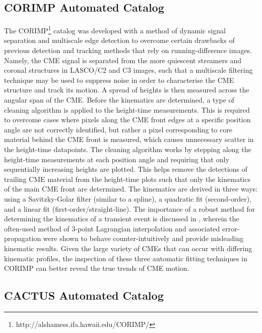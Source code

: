 \documentclass[referee,a4paper,12pt,traditabstract]{swsc}
\begin{document}
\begin{linenumbers}
\subsection{CORIMP Automated Catalog}
\label{sect_corimp}

The CORIMP\footnote{http://alshamess.ifa.hawaii.edu/CORIMP/} catalog was developed with a method of dynamic signal separation and multiscale edge detection to overcome certain drawbacks of previous detection and tracking methods that rely on running-difference images. Namely, the CME signal is separated from the more quiescent streamers and coronal structures in LASCO/C2 and C3 images, such that a multiscale filtering technique may be used to suppress noise in order to characterise the CME structure and track its motion. A spread of heights is then measured across the angular span of the CME. Before the kinematics are determined, a type of cleaning algorithm is applied to the height-time measurements. This is required to overcome cases where pixels along the CME front edges at a specific position angle are not correctly identified, but rather a pixel corresponding to core material behind the CME front is measured, which causes unnecessary scatter in the height-time datapoints. The cleaning algorithm works by stepping along the height-time measurements at each position angle and requiring that only sequentially increasing heights are plotted. This helps remove the detections of trailing CME material from the height-time plots such that only the kinematics of the main CME front are determined. The kinematics are derived in three ways: using a Savitzky-Golar filter (similar to a spline), a quadratic fit (second-order), and a linear fit (first-order/straight-line). The importance of a robust method for determining the kinematics of a transient event is discussed in \cite{2013A&A...557A..96B}, wherein the often-used method of 3-point Lagrangian interpolation and associated error-propagation were shown to behave counter-intuitively and provide misleading kinematic results. Given the large variety of CMEs that can occur with differing kinematic profiles, the inspection of these three automatic fitting techniques in CORIMP can better reveal the true trends of CME motion.


\subsection{CACTUS Automated Catalog}


\end{linenumbers}
\end{document}
